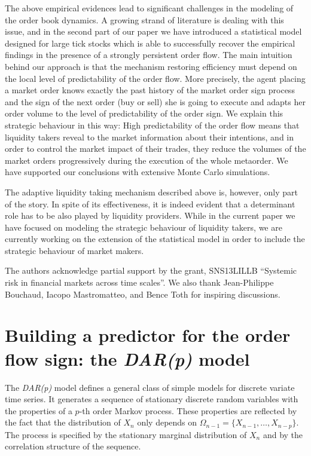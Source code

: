 \documentclass[12pt]{iopart}
\begin{document}
The above empirical evidences lead to significant challenges in the modeling of the order book dynamics. A growing strand of literature is dealing with this issue, and in the second part of our paper we have introduced a statistical model designed for large tick stocks which is able to successfully recover the empirical findings in the presence of a strongly persistent order flow. The main intuition behind our approach is that the mechanism restoring efficiency must depend on the local level of predictability of the order flow. More precisely, the agent placing a market order knows exactly the past history of the market order sign process and the sign of the next order (buy or sell) she is going to execute and adapts her order volume to the level of predictability of the order sign. We explain this strategic behaviour in this way: High predictability of the order flow means that liquidity takers reveal to the market information about their intentions, and in order to control the market impact of their trades, they reduce the volumes of the market orders progressively during the execution of the whole metaorder. We have supported our conclusions with extensive Monte Carlo simulations.

The adaptive liquidity taking mechanism described above is, however, only part of the story. In spite of its effectiveness, it is indeed evident that a determinant role has to be also played by liquidity providers. While in the current paper we have focused on modeling the strategic behaviour of liquidity takers, we are currently working on the extension of the statistical model in order to include the strategic behaviour of market makers.

\ack
The authors acknowledge partial support by the grant, SNS13LILLB “Systemic risk in financial markets across time scales”. We also thank Jean-Philippe Bouchaud, Iacopo Mastromatteo, and Bence Toth for inspiring discussions.

\appendix
\section{Building a predictor for the order flow sign: the \textit{DAR(p)} model}
\label{app:DAR}
The \textit{DAR(p)} model defines a general class of simple models for discrete variate time series. It generates a sequence of stationary discrete random variables with the properties of a $p$-th order Markov process. These properties are reflected by the fact that the distribution of $X_n$ only depends on $\Omega_{n-1}=\lbrace X_{n-1},\ldots,X_{n-p} \rbrace$. The process is specified by the stationary marginal distribution of $X_n$ and by the correlation structure of the sequence.
\end{document}
